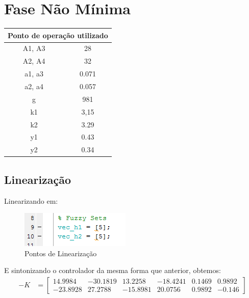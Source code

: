 \documentclass[11pt,]{article}
\begin{document}
	\section{Fase Não Mínima}      
	\begin{center}
		\begin{tabular}{|c|c|}
			\hline
			\multicolumn{2}{|c|}{Ponto de operação utilizado} \\
			\hline\hline
			A1, A3 & 28 \\ \hline
			A2, A4 & 32 \\ \hline
			a1, a3 & 0.071 \\ \hline
			a2, a4 & 0.057 \\ \hline
			g & 981 \\ \hline
			k1 & 3,15 \\ \hline
			k2 & 3.29 \\ \hline
			y1 & 0.43 \\ \hline
			y2 & 0.34 \\ \hline
			\hline
		\end{tabular}
	\end{center}
	
	\subsection{Linearização}    
	Linearizando em:
	\begin{figure}[H]
		\centering
		\includegraphics[scale=1]{cod_fuz_05.png}
		\caption{Pontos de Linearização}
		\label{CodigoLin05_2}
	\end{figure}

	E sintonizando o controlador da mesma forma que anterior, obtemos:
	\begin{align*}
	-K &= 
	\begin{bmatrix}
	14.9984 & -30.1819 & 13.2258 & -18.4241 & 0.1469 & 0.9892\\
	-23.8928 & 27.2788 & -15.8981 & 20.0756 & 0.9892 & -0.146
	\end{bmatrix}
	\end{align*}
	
\end{document}
